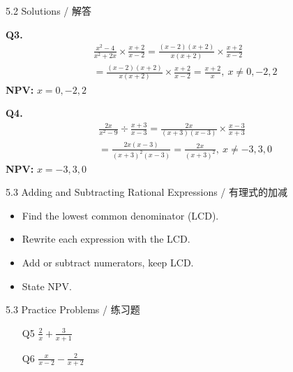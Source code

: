 \documentclass[aspectratio=169]{beamer}
\begin{document}
\begin{frame}{5.2 Solutions / 解答}
    \begin{tcolorbox}[colback=lightgray,colframe=primary,title=Solutions]
        \footnotesize
        \textbf{Q3.}
        \begin{align*}
            &\frac{x^2-4}{x^2+2x} \times \frac{x+2}{x-2} = \frac{(x-2)(x+2)}{x(x+2)} \times \frac{x+2}{x-2} \\
            &= \frac{(x-2)(x+2)}{x(x+2)} \times \frac{x+2}{x-2} = \frac{x+2}{x},\ x\neq0,-2,2
        \end{align*}
        \textbf{NPV:} $x=0,-2,2$
        
        \textbf{Q4.}
        \begin{align*}
            &\frac{2x}{x^2-9} \div \frac{x+3}{x-3} = \frac{2x}{(x+3)(x-3)} \times \frac{x-3}{x+3} \\
            &= \frac{2x(x-3)}{(x+3)^2(x-3)} = \frac{2x}{(x+3)^2},\ x\neq-3,3,0
        \end{align*}
        \textbf{NPV:} $x=-3,3,0$
    \end{tcolorbox}
\end{frame}

\begin{frame}{5.3 Adding and Subtracting Rational Expressions / 有理式的加减}
    \begin{tcolorbox}[colback=lightgray,colframe=primary,title=Key Points / 重点]
        \footnotesize
        \begin{itemize}
            \item Find the lowest common denominator (LCD).
            \item Rewrite each expression with the LCD.
            \item Add or subtract numerators, keep LCD.
            \item State NPV.
        \end{itemize}
    \end{tcolorbox}
\end{frame}

\begin{frame}{5.3 Practice Problems / 练习题}
    \begin{tcolorbox}[colback=lightgray,colframe=accent,title=Practice]
        \footnotesize
        \begin{enumerate}
            \item[Q5] $\frac{2}{x} + \frac{3}{x+1}$
            \item[Q6] $\frac{x}{x-2} - \frac{2}{x+2}$
        \end{enumerate}
    \end{tcolorbox}
\end{frame}
\end{document}
